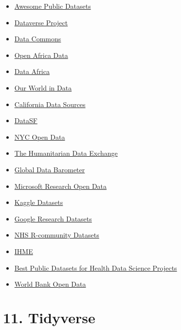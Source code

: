 \documentclass[
  letterpaper,
  DIV=11,
  numbers=noendperiod]{scrreprt}
\providecommand{\tightlist}{%
  \setlength{\itemsep}{0pt}\setlength{\parskip}{0pt}}\usepackage{longtable,booktabs,array}
\begin{document}
\begin{itemize}
\tightlist
\item
  \href{https://github.com/awesomedata/awesome-public-datasets}{Awesome
  Public Datasets}
\item
  \href{https://dataverse.org/}{Dataverse Project}
\item
  \href{https://datacommons.org/}{Data Commons}
\item
  \href{https://africaopendata.org/}{Open Africa Data}
\item
  \href{https://dataafrica.io/}{Data Africa}
\item
  \href{https://ourworldindata.org/}{Our World in Data}
\item
  \href{https://hillcrestadvisory.com/2019/01/20/california-data-sources/}{California
  Data Sources}
\item
  \href{https://datasf.org/opendata/}{DataSF}
\item
  \href{https://opendata.cityofnewyork.us/}{NYC Open Data}
\item
  \href{https://data.humdata.org/}{The Humanitarian Data Exchange}
\item
  \href{https://globaldatabarometer.org/}{Global Data Barometer}
\item
  \href{https://msropendata.com/}{Microsoft Research Open Data}
\item
  \href{https://www.kaggle.com/datasets}{Kaggle Datasets}
\item
  \href{https://datasetsearch.research.google.com/}{Google Research
  Datasets}
\item
  \href{https://nhs-r-community.github.io/NHSRdatasets/}{NHS R-community
  Datasets}
\item
  \href{https://www.healthdata.org/}{IHME}
\item
  \href{https://healthdatascience.substack.com/p/best-public-datasets-for-public-health-225}{Best
  Public Datasets for Health Data Science Projects}
\item
  \href{https://data.worldbank.org/}{World Bank Open Data}
\end{itemize}

\section{11. Tidyverse}\label{tidyverse}
\end{document}
